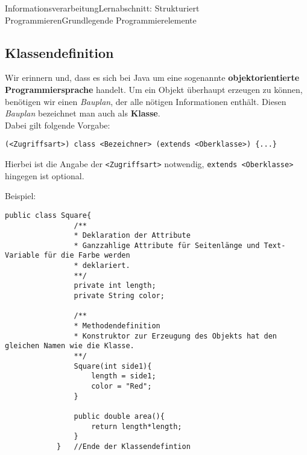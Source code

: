 \documentclass[11pt,oneside,openany,headings=optiontotoc,11pt,numbers=noenddot]{article}
\begin{document}
\begin{worksheet}{Informationsverarbeitung}{Lernabschnitt: Strukturiert Programmieren}{Grundlegende Programmierelemente}
		\subsection{Klassendefinition}
		Wir erinnern und, dass es sich bei Java um eine sogenannte \textbf{objektorientierte Programmiersprache} handelt. Um ein Objekt überhaupt erzeugen zu können, benötigen wir einen \textit{Bauplan}, der alle nötigen Informationen enthält. Diesen \textit{Bauplan} bezeichnet man auch als \textbf{Klasse}.\\
		Dabei gilt folgende Vorgabe:
		\begin{lstlisting}[style=JavaInputStyle]
			(<Zugriffsart>) class <Bezeichner> (extends <Oberklasse>) {...}
		\end{lstlisting}
		Hierbei ist die Angabe der \lstinline[style=JavaInputStyle]{<Zugriffsart>} notwendig, \lstinline[style=JavaInputStyle]{extends <Oberklasse>} hingegen ist optional.\\
		\par\noindent
		Beispiel:
		\begin{lstlisting}[style=JavaInputStyle,frame=single]
			public class Square{
				/**
				* Deklaration der Attribute
				* Ganzzahlige Attribute für Seitenlänge und Text-Variable für die Farbe werden
				* deklariert.
				**/
				private int length;
				private String color;
				
				/**
				* Methodendefinition
				* Konstruktor zur Erzeugung des Objekts hat den gleichen Namen wie die Klasse.
				**/
				Square(int side1){
					length = side1;
					color = "Red";
				}
				
				public double area(){
					return length*length;
				}
			}	//Ende der Klassendefintion
		\end{lstlisting}

\end{worksheet}
\end{document}
